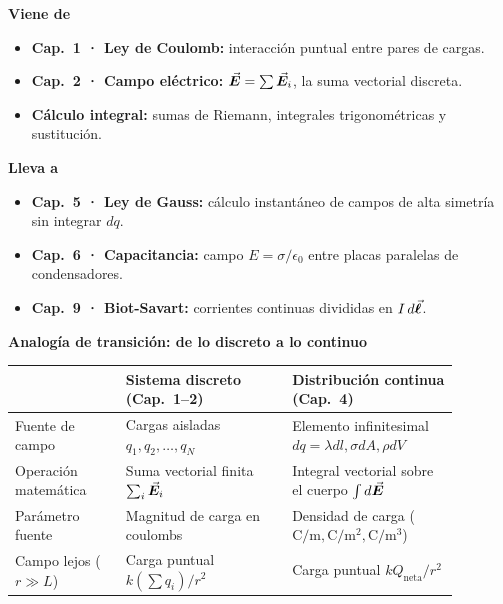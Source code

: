 \documentclass[11pt]{article}
\begin{document}
\begin{minipage}[t]{0.48\linewidth}\small
{\sffamily\small\bfseries\color{e10primary}Viene de}
\begin{itemize}[leftmargin=*,itemsep=1pt,topsep=2pt]
  \item \textbf{Cap.~1 · Ley de Coulomb:} interacción puntual entre pares de cargas.
  \item \textbf{Cap.~2 · Campo eléctrico:} $\vec{\bm{E}}=\sum \vec{\bm{E}}_i$, la suma vectorial discreta.
  \item \textbf{Cálculo integral:} sumas de Riemann, integrales trigonométricas y sustitución.
\end{itemize}
\end{minipage}\hfill
\begin{minipage}[t]{0.48\linewidth}\small
{\sffamily\small\bfseries\color{e10accentstrong}Lleva a}
\begin{itemize}[leftmargin=*,itemsep=1pt,topsep=2pt]
  \item \textbf{Cap.~5 · Ley de Gauss:} cálculo instantáneo de campos de alta simetría sin integrar $dq$.
  \item \textbf{Cap.~6 · Capacitancia:} campo $E=\sigma/\epsilon_0$ entre placas paralelas de condensadores.
  \item \textbf{Cap.~9 · Biot-Savart:} corrientes continuas divididas en $I\,d\vec{\bm{\ell}}$.
\end{itemize}
\end{minipage}

\medskip
{\sffamily\small\bfseries Analogía de transición: de lo discreto a lo continuo}
\renewcommand{\arraystretch}{1.25}
\begin{center}\footnotesize
\begin{tabular}{>{\raggedright\arraybackslash}p{0.22\linewidth} >{\centering\arraybackslash}p{0.33\linewidth} >{\centering\arraybackslash}p{0.33\linewidth}}
\toprule
 & {\sffamily\bfseries Sistema discreto (Cap.~1--2)} & {\sffamily\bfseries Distribución continua (Cap.~4)}\\
\midrule
Fuente de campo & Cargas aisladas $q_1, q_2, \dots, q_N$ & Elemento infinitesimal $dq=\lambda dl, \sigma dA, \rho dV$\\
Operación matemática & Suma vectorial finita $\sum_i \vec{\bm{E}}_i$ & Integral vectorial sobre el cuerpo $\int d\vec{\bm{E}}$\\
Parámetro fuente & Magnitud de carga en coulombs & Densidad de carga ($\mathrm{C/m}, \mathrm{C/m^2}, \mathrm{C/m^3}$)\\
Campo lejos ($r\gg L$) & Carga puntual $k(\sum q_i)/r^2$ & Carga puntual $kQ_{\text{neta}}/r^2$\\
\bottomrule
\end{tabular}
\end{center}
\end{document}
